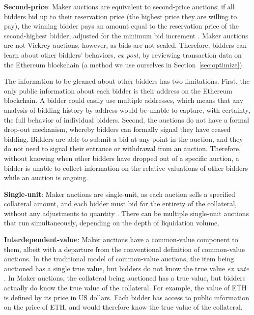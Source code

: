 \documentclass[conference]{IEEEtran}
\begin{document}
\textbf{Second-price}: Maker auctions are equivalent to second-price auctions; if all bidders bid up to their reservation price (the highest price they are willing to pay), the winning bidder pays an amount equal to the reservation price of the second-highest bidder, adjusted for the minimum bid increment \cite[p. 10]{auctionTheory.Milgrom}. Maker auctions are not Vickrey auctions, however, as bids are not sealed. Therefore, bidders can learn about other bidders' behaviors, \textit{ex post}, by reviewing transaction data on the Ethereum blockchain (a method we use ourselves in Section~\ref{sec:optimize}).

The information to be gleaned about other bidders has two limitations. First, the only public information about each bidder is their address on the Ethereum blockchain. A bidder could easily use multiple addresses, which means that any analysis of bidding history by address would be unable to capture, with certainty, the full behavior of individual bidders. Second, the auctions do not have a formal drop-out mechanism, whereby bidders can formally signal they have ceased bidding. Bidders are able to submit a bid at any point in the auction, and they do not need to signal their entrance or withdrawal from an auction. Therefore, without knowing when other bidders have dropped out of a specific auction, a bidder is unable to collect information on the relative valuations of other bidders while an auction is ongoing.

\balance
\textbf{Single-unit}: Maker auctions are single-unit, as each auction sells a specified collateral amount, and each bidder must bid for the entirety of the collateral, without any adjustments to quantity \cite{worldBank}. There can be multiple single-unit auctions that run simultaneously, depending on the depth of liquidation volume.

\textbf{Interdependent-value}: Maker auctions have a common-value component to them, albeit with a departure from the conventional definition of common-value auctions. In the traditional model of common-value auctions, the item being auctioned has a single true value, but bidders do not know the true value \textit{ex ante} \cite[p. 2]{cvAuctions}. In Maker auctions, the collateral being auctioned has a true value, but bidders actually do know the true value of the collateral. For example, the value of ETH is defined by its price in US dollars. Each bidder has access to public information on the price of ETH, and would therefore know the true value of the collateral.
\end{document}
